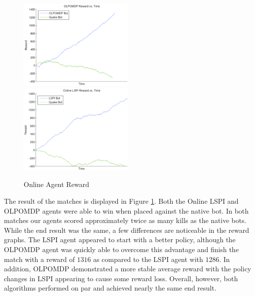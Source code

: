 \begin{figure}
		\includegraphics[width=0.5\textwidth]{OLPOMDP_Reward_vs_Time.png}
        \includegraphics[width=0.5\textwidth]{LSPI_Reward_vs_Time.png}
	\label{fig:online:reward}
    \caption{Online Agent Reward}
\end{figure}

The result of the matches is displayed in Figure \ref{fig:online:reward}. Both the Online LSPI and OLPOMDP agents were able to win when placed against the native bot. In both matches our agents scored approximately twice as many kills as the native bots. While the end result was the same, a few differences are noticeable in the reward graphs. The LSPI agent appeared to start with a better policy, although the OLPOMDP agent was quickly able to overcome this advantage and finish the match with a reward of $1316$ as compared to the LSPI agent with $1286$. In addition, OLPOMDP demonstrated a more stable average reward with the policy changes in LSPI appearing to cause some reward loss. Overall, however, both algorithms performed on par and achieved nearly the same end result.

